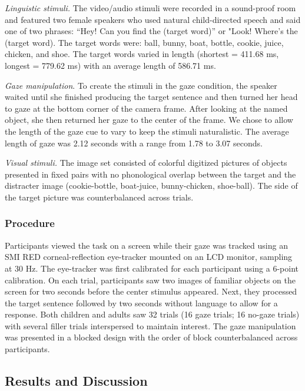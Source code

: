 \documentclass[10pt, letterpaper]{article}
\begin{document}
\emph{Linguistic stimuli.} The video/audio stimuli were recorded in a
sound-proof room and featured two female speakers who used natural
child-directed speech and said one of two phrases: ``Hey! Can you find
the (target word)'' or "Look! Where's the (target word). The target
words were: ball, bunny, boat, bottle, cookie, juice, chicken, and shoe.
The target words varied in length (shortest = 411.68 ms, longest =
779.62 ms) with an average length of 586.71 ms.

\emph{Gaze manipulation}. To create the stimuli in the gaze condition,
the speaker waited until she finished producing the target sentence and
then turned her head to gaze at the bottom corner of the camera frame.
After looking at the named object, she then returned her gaze to the
center of the frame. We chose to allow the length of the gaze cue to
vary to keep the stimuli naturalistic. The average length of gaze was
2.12 seconds with a range from 1.78 to 3.07 seconds.

\emph{Visual stimuli.} The image set consisted of colorful digitized
pictures of objects presented in fixed pairs with no phonological
overlap between the target and the distracter image (cookie-bottle,
boat-juice, bunny-chicken, shoe-ball). The side of the target picture
was counterbalanced across trials.

\hypertarget{procedure}{%
\subsubsection{Procedure}\label{procedure}}

Participants viewed the task on a screen while their gaze was tracked
using an SMI RED corneal-reflection eye-tracker mounted on an LCD
monitor, sampling at 30 Hz. The eye-tracker was first calibrated for
each participant using a 6-point calibration. On each trial,
participants saw two images of familiar objects on the screen for two
seconds before the center stimulus appeared. Next, they processed the
target sentence followed by two seconds without language to allow for a
response. Both children and adults saw 32 trials (16 gaze trials; 16
no-gaze trials) with several filler trials interspersed to maintain
interest. The gaze manipulation was presented in a blocked design with
the order of block counterbalanced across participants.

\hypertarget{results-and-discussion}{%
\subsection{Results and Discussion}\label{results-and-discussion}}
\end{document}
